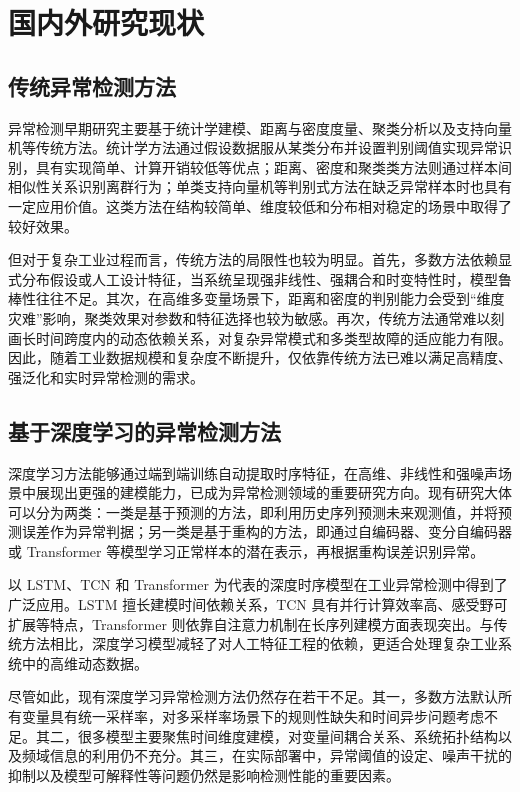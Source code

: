 \section{国内外研究现状}

\subsection{传统异常检测方法}

异常检测早期研究主要基于统计学建模、距离与密度度量、聚类分析以及支持向量机等传统方法。统计学方法通过假设数据服从某类分布并设置判别阈值实现异常识别，具有实现简单、计算开销较低等优点；距离、密度和聚类类方法则通过样本间相似性关系识别离群行为；单类支持向量机等判别式方法在缺乏异常样本时也具有一定应用价值。这类方法在结构较简单、维度较低和分布相对稳定的场景中取得了较好效果。

但对于复杂工业过程而言，传统方法的局限性也较为明显。首先，多数方法依赖显式分布假设或人工设计特征，当系统呈现强非线性、强耦合和时变特性时，模型鲁棒性往往不足。其次，在高维多变量场景下，距离和密度的判别能力会受到``维度灾难''影响，聚类效果对参数和特征选择也较为敏感。再次，传统方法通常难以刻画长时间跨度内的动态依赖关系，对复杂异常模式和多类型故障的适应能力有限。因此，随着工业数据规模和复杂度不断提升，仅依靠传统方法已难以满足高精度、强泛化和实时异常检测的需求。

\subsection{基于深度学习的异常检测方法}

深度学习方法能够通过端到端训练自动提取时序特征，在高维、非线性和强噪声场景中展现出更强的建模能力，已成为异常检测领域的重要研究方向。现有研究大体可以分为两类：一类是基于预测的方法，即利用历史序列预测未来观测值，并将预测误差作为异常判据；另一类是基于重构的方法，即通过自编码器、变分自编码器或 Transformer 等模型学习正常样本的潜在表示，再根据重构误差识别异常。

以 LSTM、TCN 和 Transformer 为代表的深度时序模型在工业异常检测中得到了广泛应用。LSTM 擅长建模时间依赖关系，TCN 具有并行计算效率高、感受野可扩展等特点，Transformer 则依靠自注意力机制在长序列建模方面表现突出。与传统方法相比，深度学习模型减轻了对人工特征工程的依赖，更适合处理复杂工业系统中的高维动态数据。

尽管如此，现有深度学习异常检测方法仍然存在若干不足。其一，多数方法默认所有变量具有统一采样率，对多采样率场景下的规则性缺失和时间异步问题考虑不足。其二，很多模型主要聚焦时间维度建模，对变量间耦合关系、系统拓扑结构以及频域信息的利用仍不充分。其三，在实际部署中，异常阈值的设定、噪声干扰的抑制以及模型可解释性等问题仍然是影响检测性能的重要因素。

